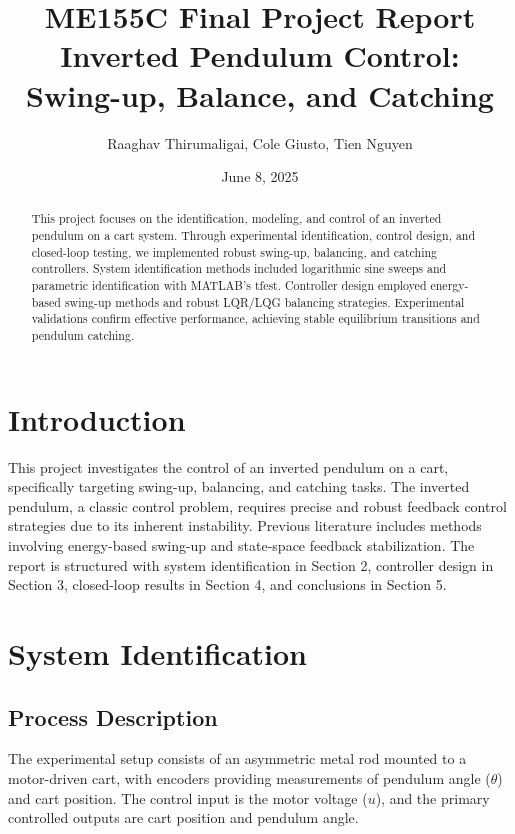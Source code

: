 \documentclass[12pt]{article}
\title{ME155C Final Project Report\\Inverted Pendulum Control: Swing-up, Balance, and Catching}
\author{Raaghav Thirumaligai, Cole Giusto, Tien Nguyen}
\date{June 8, 2025}
\begin{document}
\maketitle

\begin{abstract}
This project focuses on the identification, modeling, and control of an inverted pendulum on a cart system. Through experimental identification, control design, and closed-loop testing, we implemented robust swing-up, balancing, and catching controllers. System identification methods included logarithmic sine sweeps and parametric identification with MATLAB's tfest. Controller design employed energy-based swing-up methods and robust LQR/LQG balancing strategies. Experimental validations confirm effective performance, achieving stable equilibrium transitions and pendulum catching.
\end{abstract}

\section{Introduction}
This project investigates the control of an inverted pendulum on a cart, specifically targeting swing-up, balancing, and catching tasks. The inverted pendulum, a classic control problem, requires precise and robust feedback control strategies due to its inherent instability. Previous literature includes methods involving energy-based swing-up and state-space feedback stabilization. The report is structured with system identification in Section 2, controller design in Section 3, closed-loop results in Section 4, and conclusions in Section 5.

\section{System Identification}

\subsection{Process Description}
The experimental setup consists of an asymmetric metal rod mounted to a motor-driven cart, with encoders providing measurements of pendulum angle ($\theta$) and cart position. The control input is the motor voltage ($u$), and the primary controlled outputs are cart position and pendulum angle.
\end{document}
